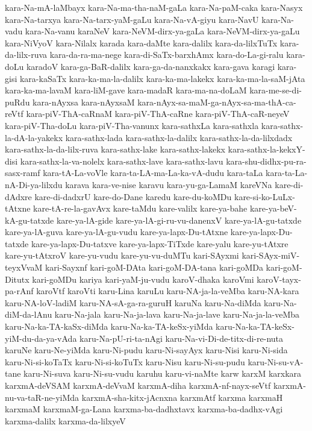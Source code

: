 {kara-Na-mA-laMbayx
kara-Na-ma-tha-naM-gaLa
kara-Na-paM-caka
kara-Nasyx
kara-Na-tarxya
kara-Na-tarx-yaM-gaLu
kara-Na-vA-giyu
kara-NavU
kara-Na-vadu
kara-Na-vanu
karaNeV
kara-NeVM-dirx-ya-gaLa
kara-NeVM-dirx-ya-gaLu
kara-NiVyoV
kara-Nilalx
karada
kara-daMte
kara-dalilx
kara-da-lilxTuTx
kara-da-lilx-ruva
kara-da-ra-ma-nege
kara-di-SaTx-barxhAmx
kara-do-La-gi-ralu
kara-doLu
karadoV
kara-ga-BaR-dalilx
kara-ga-da-nanxkakx
kara-gava
karagi
kara-gisi
kara-kaSaTx
kara-ka-ma-la-dalilx
kara-ka-ma-lakekx
kara-ka-ma-la-saM-jAta
kara-ka-ma-lavaM
kara-liM-gave
kara-madaR
kara-ma-na-doLaM
kara-me-se-di-puRdu
kara-nAyxsa
kara-nAyxsaM
kara-nAyx-sa-maM-ga-nAyx-sa-ma-thA-ca-reVtf
kara-piV-ThA-caRnaM
kara-piV-ThA-caRne
kara-piV-ThA-caR-neyeV
kara-piV-Tha-doLu
kara-piV-Tha-vanunx
kara-sathxLa
kara-sathxla
kara-sathx-la-dA-la-yakekx
kara-sathx-lada
kara-sathx-la-dalilx
kara-sathx-la-da-lilxdadx
kara-sathx-la-da-lilx-ruva
kara-sathx-lake
kara-sathx-lakekx
kara-sathx-la-kekxY-disi
kara-sathx-la-va-nolelx
kara-sathx-lave
kara-sathx-lavu
kara-shu-didhx-pu-ra-sasx-ramf
kara-tA-La-voVle
kara-ta-LA-ma-La-ka-vA-dudu
kara-taLa
kara-ta-La-nA-Di-ya-lilxdu
karava
kara-ve-nise
karavu
kara-yu-ga-LamaM
kareVNa
kare-di-dAdxre
kare-di-dadxrU
kare-do-Dane
karedu
kare-du-koMDu
kare-si-ko-LuLx-tAtxne
kare-tA-re-la-gavAvx
kare-taMdu
kare-valilx
kare-ya-bahe
kare-ya-beV-kA-gu-tatxde
kare-ya-lA-gide
kare-ya-lA-gi-ru-vu-danenxV
kare-ya-lA-gu-tatxde
kare-ya-lA-guva
kare-ya-lA-gu-vudu
kare-ya-lapx-Du-tAtxne
kare-ya-lapx-Du-tatxde
kare-ya-lapx-Du-tatxve
kare-ya-lapx-TiTxde
kare-yalu
kare-yu-tAtxre
kare-yu-tAtxroV
kare-yu-vudu
kare-yu-vu-duMTu
kari-SAyxmi
kari-SAyx-miV-teyxVvaM
kari-Sayxnf
kari-goM-DAta
kari-goM-DA-tana
kari-goMDa
kari-goM-Ditutx
kari-goMDu
kariya
kari-yaM-ju-vudu
karoV-dhaka
karoVmi
karoV-tayx-pa-rAnf
karoVtf
karoVti
karu-Lina
karuLu
karu-NA-ja-la-veMba
karu-NA-kara
karu-NA-loV-ladiM
karu-NA-sA-ga-ra-guruH
karuNa
karu-Na-diMda
karu-Na-diM-da-lAnu
karu-Na-jala
karu-Na-ja-lava
karu-Na-ja-lave
karu-Na-ja-la-veMba
karu-Na-ka-TA-kaSx-diMda
karu-Na-ka-TA-keSx-yiMda
karu-Na-ka-TA-keSx-yiM-du-da-ya-vAda
karu-Na-pU-ri-ta-nAgi
karu-Na-vi-Di-de-titx-di-re-nuta
karuNe
karu-Ne-yiMda
karu-Ni-pudu
karu-Ni-sayAyx
karu-Nisi
karu-Ni-sida
karu-Ni-si-koTaTx
karu-Ni-si-koTuTx
karu-Nisu
karu-Ni-su-pudu
karu-Ni-su-vA-tane
karu-Ni-suva
karu-Ni-su-vudu
karuhu
karu-vi-naMte
karw
karxM
karxkara
karxmA-deVSAM
karxmA-deVvaM
karxmA-diha
karxmA-nf-nayx-seVtf
karxmA-nu-va-taR-ne-yiMda
karxmA-sha-kitx-jAcnxna
karxmAtf
karxma
karxmaH
karxmaM
karxmaM-ga-Lana
karxma-ba-dadhxtavx
karxma-ba-dadhx-vAgi
karxma-dalilx
karxma-da-lilxyeV
}
